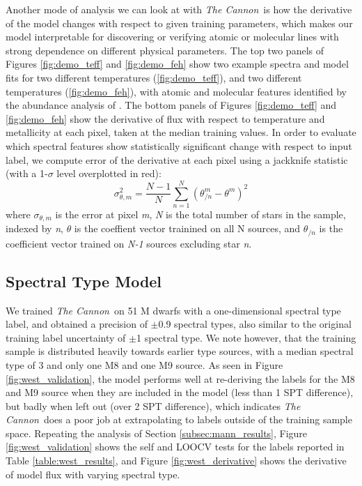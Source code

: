 \documentclass[modern]{aastex62}
\newcommand{\thecannon}{\textsl{The Cannon}}
\begin{document}
Another mode of analysis we can look at with \thecannon\ is how the derivative of the model changes with respect to given training parameters, which makes our model interpretable for discovering or verifying atomic or molecular lines with strong dependence on different physical parameters. The top two panels of Figures \ref{fig:demo_teff} and \ref{fig:demo_feh} show two example spectra and model fits for two different temperatures (\ref{fig:demo_teff}), and two different temperatures (\ref{fig:demo_feh}), with atomic and molecular features identified by the abundance analysis of \citealt{Souto:2017}. The bottom panels of Figures \ref{fig:demo_teff} and \ref{fig:demo_feh} show the derivative of flux with respect to temperature and metallicity at each pixel, taken at the median training values. In order to evaluate which spectral features show statistically significant change with respect to input label, we compute error of the derivative at each pixel using a jackknife statistic (with a 1-$\sigma$ level overplotted in red):
\begin{equation}
	\sigma_{\theta,m}^2 = \frac{N-1}{N} \sum^N_{n=1} (\theta_{/n}^m - \theta^m)^2 
\end{equation}
where $\sigma_{\theta,m}$ is the error at pixel \emph{m}, \emph{N} is the total number of stars in the sample, indexed by \emph{n}, $\theta$ is the coeffient vector trainined on all N sources, and $\theta_{/n}$ is the coefficient vector trained on \emph{N-1} sources excluding star \emph{n}.

\color{gcolor}{Some note on what lines vary significantly with parameter...}\color{black}

\color{gcolor}{HOGG: Some commentary on why $\chi^2$ is higher than expected. Also explain why this means that the model is good to percent level.}\color{black}

\subsection{Spectral Type Model \label{subsec:west_results}}
We trained \thecannon\ on 51 M dwarfs with a one-dimensional spectral type label, and obtained a precision of $\pm$0.9 spectral types, also similar to the original training label uncertainty of $\pm$1 spectral type. We note however, that the training sample is distributed heavily towards earlier type sources, with a median spectral type of 3 and only one M8 and one M9 source. As seen in Figure \ref{fig:west_validation}, the model performs well at re-deriving the labels for the M8 and M9 source when they are included in the model (less than 1 SPT difference), but badly when left out (over 2 SPT difference), which indicates \thecannon\ does a poor job at extrapolating to labels outside of the training sample space. Repeating the analysis of Section \ref{subsec:mann_results}, Figure \ref{fig:west_validation} shows the self and LOOCV tests for the labels reported in Table \ref{table:west_results}, and Figure \ref{fig:west_derivative} shows the derivative of model flux with varying spectral type.
\end{document}
